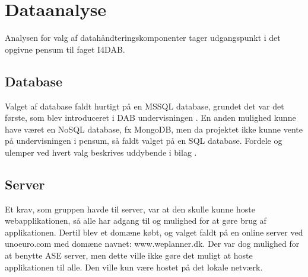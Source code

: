\section{Dataanalyse}
Analysen for valg af datahåndteringskomponenter tager udgangspunkt i det opgivne pensum til faget I4DAB. \cite{DAB}
\subsection{Database}
Valget af database faldt hurtigt på en MSSQL database, grundet det var det første, som blev introduceret i DAB undervisningen \cite{DAB}. En anden mulighed kunne have været en NoSQL database, fx MongoDB, men da projektet ikke kunne vente på undervisningen i pensum, så faldt valget på en SQL database. Fordele og ulemper ved hvert valg beskrives uddybende i bilag \cite{DataAnalyse}.

\subsection{Server}
Et krav, som gruppen havde til server, var at den skulle kunne hoste webapplikationen, så alle har adgang til og mulighed for at gøre brug af applikationen. Dertil blev et domæne købt, og valget faldt på en online server ved unoeuro.com\cite{UnoEuro} med domæne navnet: www.weplanner.dk. Der var dog mulighed for at benytte ASE server, men dette ville ikke gøre det muligt at hoste applikationen til alle. Den ville kun være hostet på det lokale netværk. \\
